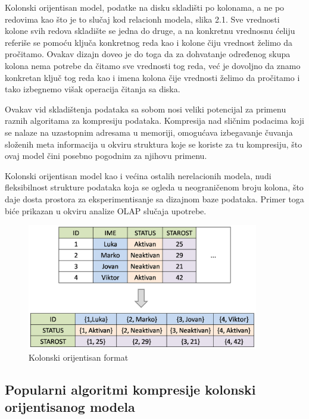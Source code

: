 \documentclass[12pt,oneside]{memoir}
\begin{document}
Kolonski orijentisan model, podatke na disku skladišti po kolonama, a ne po redovima kao što je to slučaj kod relacionh modela, slika 2.1. Sve vrednosti kolone svih redova skladište se jedna do druge, a na konkretnu vrednosnu ćeliju referiše se pomoću ključa konkretnog reda kao i kolone čiju vrednost želimo da pročitamo. Ovakav dizajn doveo je do toga da za dohvatanje određenog skupa kolona nema potrebe da čitamo sve vrednosti tog reda, već je dovoljno da znamo konkretan ključ tog reda kao i imena kolona čije vrednosti želimo da pročitamo i tako izbegnemo višak operacija čitanja sa diska.

Ovakav vid skladištenja podataka sa sobom nosi veliki potencijal za primenu raznih algoritama za kompresiju podataka.  Kompresija nad sličnim podacima koji se nalaze na uzastopnim adresama u memoriji, omogućava izbegavanje čuvanja složenih meta informacija u okviru struktura koje se koriste za tu kompresiju, što ovaj model čini posebno pogodnim za njihovu primenu.

Kolonski orijentisan model kao i većina ostalih nerelacionih modela, nudi fleksibilnost strukture podataka koja se ogleda u neograničenom broju kolona, što daje dosta prostora za eksperimentisanje sa dizajnom baze podataka. Primer toga biće prikazan u okviru analize OLAP slučaja upotrebe. 
\begin{figure}[!ht]
  \vspace*{4cm}
  \centering
  \includegraphics[width=0.9\textwidth]{relational-column-oriented.png}
  \caption{Kolonski orijentisan format}
  \label{fig:grafikon}
\end{figure}

\subsection{Popularni algoritmi kompresije kolonski orijentisanog modela}
\end{document}
